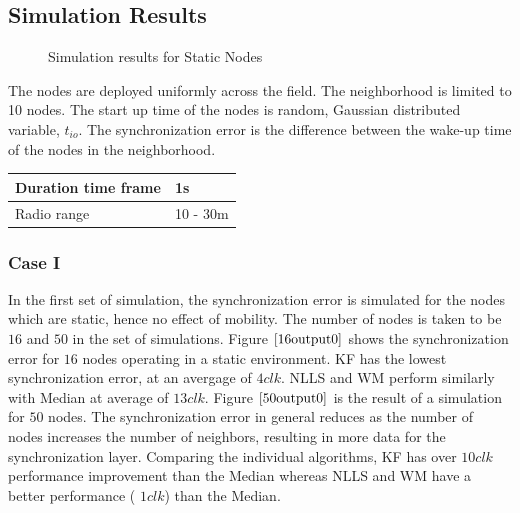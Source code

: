 \documentclass[journal]{IEEEtran}
\begin{document}
\subsection{\textbf{Simulation Results}}
\begin{figure}
\centerline{
\hfil
{}}
\caption{Simulation results for Static Nodes }
\label{static}
\end{figure}
The nodes are deployed uniformly across the field. The neighborhood is limited
to 10 nodes. The start up time of the
nodes is random, Gaussian distributed variable, $t_{io}$. The
synchronization error is the difference between the wake-up time of the nodes in the
neighborhood.
\newline
\begin{center}
    \begin{tabular}{ | l | l |}
    \hline
    Duration time frame & 1s \\ \hline
    Radio range & 10 - 30m \\ \hline
    \end{tabular}
\end{center}
\subsubsection{\textbf{Case I}} In the first set of simulation, the
synchronization error is simulated for the nodes which are static,
hence no effect of mobility. The number of nodes is taken to be $16$
and $50$ in the set of simulations.
\newline Figure $\ref{16output0}$
shows the synchronization error for $16$ nodes operating in a static
environment. KF has the lowest synchronization error, at an avergage
of $4clk$. NLLS and WM perform similarly with Median at average of
$13clk$. \newline Figure $\ref{50output0}$ is the result of a
simulation for $50$ nodes. The synchronization error in general
reduces as the number of nodes increases the number of neighbors,
resulting in more data for the synchronization layer. Comparing the
individual algorithms, KF has over $10clk$ performance improvement
than the Median whereas NLLS and WM have a better performance (
$1clk$) than the Median.
\end{document}

